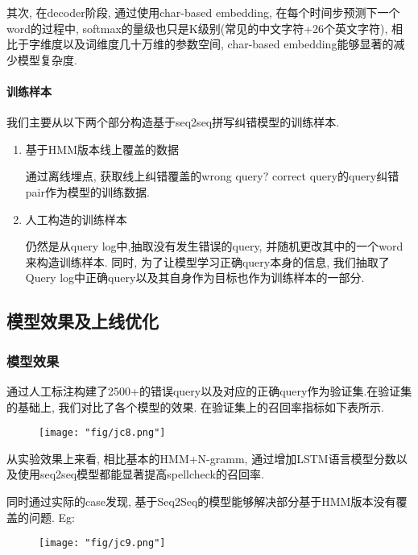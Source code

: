 \par 其次, 在decoder阶段, 通过使用char-based embedding, 在每个时间步预测下一个word的过程中, softmax的量级也只是K级别(常见的中文字符+26个英文字符), 相比于字维度以及词维度几十万维的参数空间, char-based embedding能够显著的减少模型复杂度. 

\paragraph{训练样本}

我们主要从以下两个部分构造基于seq2seq拼写纠错模型的训练样本.
\begin{enumerate}
\item 基于HMM版本线上覆盖的数据

\par 通过离线埋点, 获取线上纠错覆盖的wrong query? correct query的query纠错pair作为模型的训练数据.

\item 人工构造的训练样本

\par 仍然是从query log中,抽取没有发生错误的query, 并随机更改其中的一个word来构造训练样本. 同时, 为了让模型学习正确query本身的信息, 我们抽取了Query log中正确query以及其自身作为目标也作为训练样本的一部分.
\end{enumerate}

\subsection{模型效果及上线优化}

\subsubsection{模型效果}

通过人工标注构建了2500+的错误query以及对应的正确query作为验证集.在验证集的基础上, 我们对比了各个模型的效果. 在验证集上的召回率指标如下表所示.

\begin{figure}[!h]
	\centering
	\texttt{[image: "fig/jc8.png"]}
	\caption{}
	\label{fig:jc8}
\end{figure}

从实验效果上来看, 相比基本的HMM+N-gramm, 通过增加LSTM语言模型分数以及使用seq2seq模型都能显著提高spellcheck的召回率. 

同时通过实际的case发现, 基于Seq2Seq的模型能够解决部分基于HMM版本没有覆盖的问题. Eg:

\begin{figure}[!h]
	\centering
	\texttt{[image: "fig/jc9.png"]}
	\caption{}
	\label{fig:jc9}
\end{figure}

